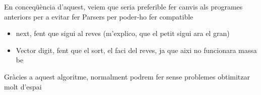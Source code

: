 \documentclass{article}
\begin{document}
En conceqüència d'aquest, veiem que seria preferible fer canvis als programes anteriors per a evitar fer Parsers per poder-ho fer compatible
\begin{itemize}
\item next, fent que sigui al reves (m'explico, que el petit sigui ara el gran)
\item Vector digit, fent que el sort, el faci del reves, ja que aixi no funcionara massa be
\end{itemize}

Gràcies a aquest algoritme, normalment podrem fer sense problemes obtimitzar molt d'espai
\end{document}
